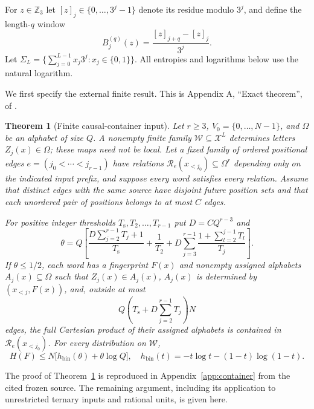 \documentclass[11pt]{article}
\newtheorem{theorem}{Theorem}[section]
\theoremstyle{definition}
\theoremstyle{remark}
\newcommand{\Z}{\mathbb Z}
\newcommand{\hb}{h_{\mathrm{bin}}}
\begin{document}
For $z\in\Z_3$ let $[z]_j\in\{0,\ldots,3^j-1\}$ denote its
residue modulo $3^j$, and define the length-$q$ window
\[
 B_j^{(q)}(z)=\frac{[z]_{j+q}-[z]_j}{3^j}.
\]
Let $\Sigma_L=\{\sum_{j=0}^{L-1}x_j3^j:x_j\in\{0,1\}\}$.
All entropies and logarithms below use the natural logarithm.

We first specify the external finite result. This is Appendix A,
``Exact theorem'', of \cite{Core}.

\begin{theorem}[Finite causal-container input]\label{thm:container}
Let $r\ge3$, $V_0=\{0,\ldots,N-1\}$, and $\Omega$ be an alphabet
of size $Q$. A nonempty finite family $\mathcal W\subseteq\mathcal X^L$
determines letters $Z_j(x)\in\Omega$; these maps need not be local.
Let a fixed family of ordered positional edges
$e=(j_0<\cdots<j_{r-1})$ have relations
$\mathcal R_e(x_{<j_0})\subseteq\Omega^r$ depending only on the
indicated input prefix, and suppose every word satisfies every relation.
Assume that distinct edges with the same source have disjoint future
position sets and that each unordered pair of positions belongs to
at most $C$ edges.

For positive integer thresholds $T_{\mathrm s},T_2,\ldots,T_{r-1}$
put $D=CQ^{r-3}$ and
\begin{equation}\label{eq:theta}
 \theta=Q\left[
 \frac{D\sum_{j=2}^{r-1}T_j+1}{T_{\mathrm s}}
 +\frac1{T_2}
 +D\sum_{j=3}^{r-1}\frac{1+\sum_{l=2}^{j-1}T_l}{T_j}
 \right].
\end{equation}
If $\theta\le1/2$, each word has a fingerprint $F(x)$ and nonempty
assigned alphabets $A_j(x)\subseteq\Omega$ such that $Z_j(x)\in A_j(x)$,
$A_j(x)$ is determined by $(x_{<j},F(x))$, and, outside at most
\begin{equation}\label{eq:badbound}
 Q\left(T_{\mathrm s}+D\sum_{j=2}^{r-1}T_j\right)N
\end{equation}
edges, the \emph{full Cartesian product} of their assigned alphabets
is contained in $\mathcal R_e(x_{<j_0})$. For every distribution on
$\mathcal W$,
\[
 H(F)\le N\bigl[\hb(\theta)+\theta\log Q\bigr],
 \quad \hb(t)=-t\log t-(1-t)\log(1-t).
\]
\end{theorem}

The proof of Theorem~\ref{thm:container} is reproduced in
Appendix~\ref{app:container} from the cited frozen source. The remaining argument, including its application to
unrestricted ternary inputs and rational units, is given here.
\end{document}
